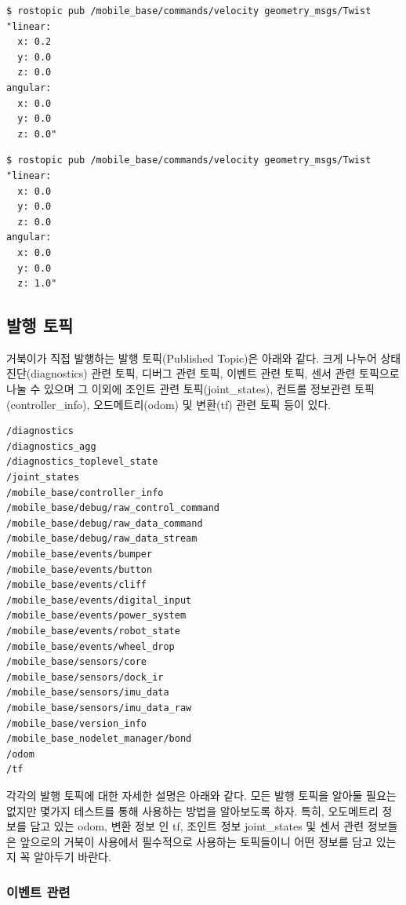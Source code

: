 \vspace{\baselineskip}
\begin{lstlisting}[language=ROS]
$ rostopic pub /mobile_base/commands/velocity geometry_msgs/Twist "linear:
  x: 0.2
  y: 0.0
  z: 0.0
angular:
  x: 0.0
  y: 0.0
  z: 0.0"
\end{lstlisting}

\begin{lstlisting}[language=ROS]
$ rostopic pub /mobile_base/commands/velocity geometry_msgs/Twist "linear:
  x: 0.0
  y: 0.0
  z: 0.0
angular:
  x: 0.0
  y: 0.0
  z: 1.0"
\end{lstlisting}

\subsection{발행 토픽}

거북이가 직접 발행하는 발행 토픽(Published Topic)은 아래와 같다. 크게 나누어 상태 진단(diagnostics) 관련 토픽, 디버그 관련 토픽, 이벤트 관련 토픽, 센서 관련 토픽으로 나눌 수 있으며 그 이외에 조인트 관련 토픽(joint\_states), 컨트롤 정보관련 토픽(controller\_info), 오드메트리(odom) 및 변환(tf) 관련 토픽 등이 있다.

\begin{lstlisting}[language=ROS]
/diagnostics
/diagnostics_agg
/diagnostics_toplevel_state
/joint_states
/mobile_base/controller_info
/mobile_base/debug/raw_control_command
/mobile_base/debug/raw_data_command
/mobile_base/debug/raw_data_stream
/mobile_base/events/bumper
/mobile_base/events/button
/mobile_base/events/cliff
/mobile_base/events/digital_input
/mobile_base/events/power_system
/mobile_base/events/robot_state
/mobile_base/events/wheel_drop
/mobile_base/sensors/core
/mobile_base/sensors/dock_ir
/mobile_base/sensors/imu_data
/mobile_base/sensors/imu_data_raw
/mobile_base/version_info
/mobile_base_nodelet_manager/bond
/odom
/tf
\end{lstlisting}

각각의 발행 토픽에 대한 자세한 설명은 아래와 같다. 모든 발행 토픽을 알아둘 필요는 없지만 몇가지 테스트를 통해 사용하는 방법을 알아보도록 하자. 특히, 오도메트리 정보를 담고 있는 odom, 변환 정보 인 tf, 조인트 정보 joint\_states 및 센서 관련 정보들은 앞으로의 거북이 사용에서 필수적으로 사용하는 토픽들이니 어떤 정보를 담고 있는지 꼭 알아두기 바란다.

\subsubsection{이벤트 관련}

